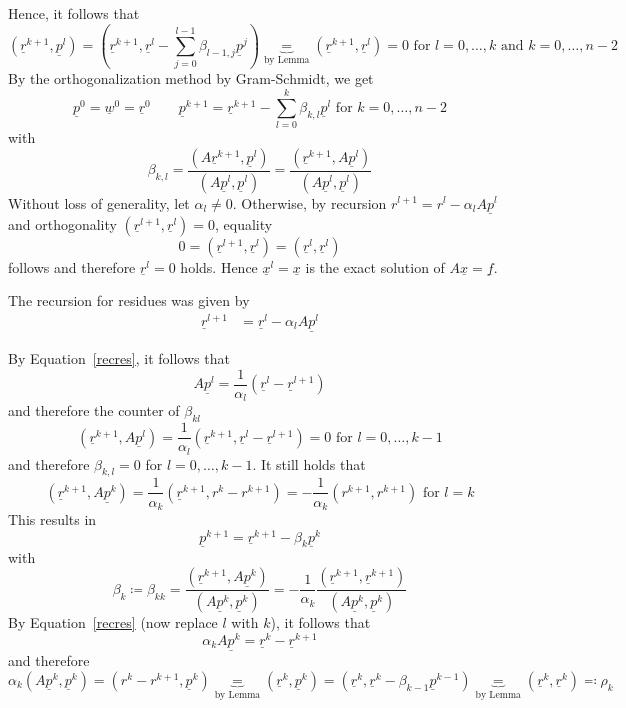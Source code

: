 \documentclass{article}
\begin{document}
Hence, it follows that
\[ (\underline{r}^{k+1}, \underline{p}^l) = (\underline{r}^{k+1}, \underline{r}^l - \sum_{j=0}^{l-1} \beta_{l-1,j} \underline{p}^j) \underbrace{=}_{\text{by Lemma}} (\underline{r}^{k+1}, \underline{r}^l) = 0  \text{ for } l=0,\ldots,k \text{ and } k=0,\ldots,n-2 \]
By the orthogonalization method by Gram-Schmidt, we get
\[ \underline{p}^0 = \underline{w}^0 = \underline{r}^0 \qquad \underline{p}^{k+1} = \underline{r}^{k+1} - \sum_{l=0}^{k} \beta_{k,l} \underline{p}^l \text{ for } k=0,\ldots,n-2 \]
with
\[ \beta_{k,l} = \frac{(A \underline{r}^{k+1}, \underline{p}^l)}{(A \underline{p}^l, \underline{p}^l)} = \frac{(\underline{r}^{k+1}, A \underline{p}^l)}{(A \underline{p}^l, \underline{p}^l)} \]
Without loss of generality, let $\alpha_l \neq 0$.
Otherwise, by recursion $r^{l+1} = r^l - \alpha_l A \underline{p}^l$ and orthogonality $(\underline{r}^{l+1}, \underline{r}^l) = 0$, equality
\[ 0 = (\underline{r}^{l+1}, \underline{r}^l) = (\underline{r}^l, \underline{r}^l) \]
follows and therefore $\underline{r}^l = 0$ holds. Hence $\underline{x}^l = \underline{x}$ is the exact solution of $A \underline{x} = \underline{f}$.

The recursion for residues was given by
\begin{align}
  \underline{r}^{l+1} &= \underline{r}^l - \alpha_l A \underline{p}^l \label{recres}
\end{align}

By Equation~\ref{recres}, it follows that
\[ A \underline{p}^l = \frac{1}{\alpha_l} \left(\underline{r}^l - \underline{r}^{l+1}\right) \]
and therefore the counter of $\beta_{kl}$
\[ (\underline{r}^{k+1}, A \underline{p}^l) = \frac{1}{\alpha_l} (\underline{r}^{k+1}, \underline{r}^l - \underline{r}^{l+1}) = 0 \text{ for } l=0,\ldots,k-1 \]
and therefore $\beta_{k,l} = 0$ for $l=0,\ldots,k-1$.
It still holds that
\[ (\underline{r}^{k+1}, A \underline{p}^k) = \frac{1}{\alpha_k} (\underline{r}^{k+1}, r^k - r^{k+1}) = -\frac{1}{\alpha_k} (r^{k+1}, r^{k+1}) \text{ for } l = k \]
This results in
\[ \underline{p}^{k+1} = \underline{r}^{k+1} - \beta_k \underline{p}^k \]
with
\[ \beta_k \coloneqq \beta_{kk} = \frac{(\underline{r}^{k+1}, A \underline{p}^k)}{(A \underline{p}^k, \underline{p}^k)} = -\frac{1}{\alpha_k} \frac{(\underline{r}^{k+1}, \underline{r}^{k+1})}{(A \underline{p}^k, \underline{p}^k)} \]
By Equation~\ref{recres} (now replace $l$ with $k$), it follows that
\[ \alpha_k A \underline{p}^k = \underline{r}^k - \underline{r}^{k+1} \]
and therefore
\[ \alpha_k (A \underline{p}^k, \underline{p}^k) = (r^k - r^{k+1}, \underline{p}^k) \underbrace{=}_{\text{by Lemma}} (\underline{r}^k, \underline{p}^k) = (\underline{r}^k, \underline{r}^k - \beta_{k-1} \underline{p}^{k-1}) \underbrace{=}_{\text{by Lemma}} (\underline r^k, \underline r^k) \eqqcolon \rho_k \]
\end{document}
